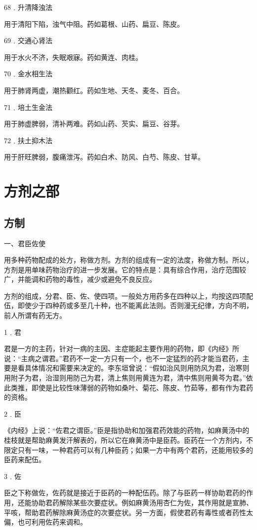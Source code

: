 \documentclass[12pt,UTF8]{ctexbook}
\begin{document}
68﹒升清降浊法

用于清阳下陷，浊气中阻。药如葛根、山药、扁豆、陈皮。

69﹒交通心肾法

用于水火不济，失眠艰寐。药如黄连、肉桂。

70﹒金水相生法

用于肺肾两虚，潮热颧红。药如生地、天冬、麦冬、百合。

71﹒培土生金法

用于肺虚脾弱，清补两难。药如山药、芡实、扁豆、谷芽。

72﹒扶土抑木法

用于肝旺脾弱，腹痛泄泻。药如白术、防风、白芍、陈皮、甘草。

\chapter{方剂之部}

\section{方制}

一、君臣佐使

用多种药物配成的处方，称做方剂。方剂的组成有一定的法度，称做方制。所以，方剂是用单味药物治疗的进一步发展。它的特点是：具有综合作用，治疗范围较广，并能调和药物的毒性，减少或避免不良反应。

方剂的组成，分君、臣、佐、使四项。一般处方用药多在四种以上，均按这四项配伍，即使少于四种药或多至几十种，也不能离此法则。否则漫无纪律，方向不明，前人所谓有药无方。

1﹒君

君是一方的主药，针对一病的主因、主症能起主要作用的药物，即《内经》所说：“主病之谓君。”君药不一定一方只有一个，也不一定猛烈的药才能当君药，主要是看具体情况和需要来决定的。李东垣曾说：“假如治风则用防风为君，治寒则用附子为君，治湿则用防己为君，清上焦则用黄连为君，清中焦则用黄芩为君。”依此类推，即使是比较性味薄弱的药物如桑叶、菊花、陈皮、竹茹等，都有作为君药的资格。

2﹒臣

《内经》上说：“佐君之谓臣。”臣是指协助和加强君药效能的药物，如麻黄汤中的桂枝就是帮助麻黄发汗解表的，所以它在麻黄汤中是臣药。臣药在一个方剂内，不限定只有一味，一种君药可以有几种臣药；如果一方中有两个君药，还能用较多的臣药来配伍。

3﹒佐

臣之下称做佐，佐药就是接近于臣药的一种配伍药。除了与臣药一样协助君药的作用，还能协助君药解除某些次要症状。例如麻黄汤用杏仁为佐，其作用就是宣肺、平咳，帮助君药解除麻黄汤症的次要症状。另一方面，假使君药有毒性或者药性太偏，也可利用佐药来调和。
\end{document}

